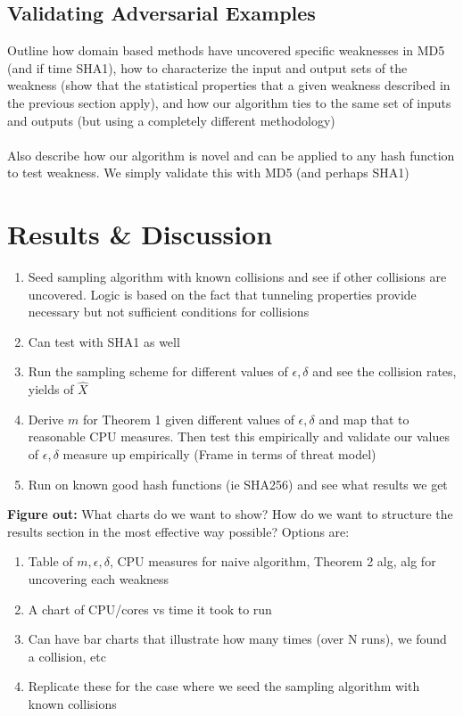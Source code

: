 \subsection{Validating Adversarial Examples}
Outline how domain based methods have uncovered specific weaknesses in MD5 (and if time SHA1), how to characterize the input and output sets of the weakness (show that the statistical properties that a given weakness described in the previous section apply), and how our algorithm ties to the same set of inputs and outputs (but using a completely different methodology)
\\
\\
Also describe how our algorithm is novel and can be applied to any hash function to test weakness. We simply validate this with MD5 (and perhaps SHA1)

\section{Results \& Discussion}

\begin{enumerate}
\item Seed sampling algorithm with known collisions and see if other collisions are uncovered. Logic is based on the fact that tunneling properties provide necessary but not sufficient conditions for collisions 
\item Can test with SHA1 as well
\item Run the sampling scheme for different values of $\epsilon, \delta$ and see the collision rates, yields of $\hat{X}$
\item Derive $m$ for Theorem 1 given different values of $\epsilon, \delta$ and map that to reasonable CPU measures. Then test this empirically and validate our values of $\epsilon, \delta$ measure up empirically (Frame in terms of threat model) 
\item Run on known good hash functions (ie SHA256) and see what results we get
\end{enumerate}

\textbf{Figure out:} What charts do we want to show? How do we want to structure the results section in the most effective way possible? Options are: 

\begin{enumerate}
\item Table of $m, \epsilon, \delta$, CPU measures for naive algorithm, Theorem 2 alg, alg for uncovering each weakness
\item A chart of CPU/cores vs time it took to run
\item Can have bar charts that illustrate how many times (over N runs), we found a collision, etc
\item Replicate these for the case where we seed the sampling algorithm with known collisions
\end{enumerate}

